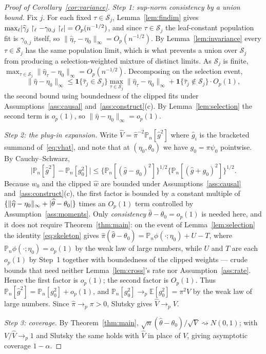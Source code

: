 \documentclass[11pt]{article}
\theoremstyle{plain}
\theoremstyle{definition}
\theoremstyle{remark}
\newcommand{\E}{\mathbb{E}}
\newcommand{\Pn}{\mathbb{P}_n}
\newcommand{\cS}{\mathcal{S}}
\newcommand{\wz}{w_0}
\newcommand{\what}{\widehat{w}}
\newcommand{\that}{\widehat{\tau}}
\newcommand{\thetahat}{\widehat{\theta}}
\newcommand{\pihat}{\widehat{\pi}}
\newcommand{\Vhat}{\widehat{V}}
\newcommand{\Linf}[1]{\lVert #1 \rVert_{\infty}}
\DeclarePairedDelimiter{\abs}{\lvert}{\rvert}
\begin{document}
\begin{proof}[Proof of Corollary~\ref{cor:variance}]
\emph{Step 1: sup-norm consistency by a union bound.} Fix $j$. For each fixed
$\tau\in\cS_j$, Lemma~\ref{lem:findim} gives
$\max_\ell\abs{\widehat\gamma_j\restriction_\ell-\gamma_{0,j}\restriction_\ell}
=O_p(n^{-1/2})$, and since $\tau\in\cS_j$ the leaf-constant population fit is
$\gamma_{0,j}$ itself, so $\Linf{\widehat\eta_\tau-\eta_0}=O_p(n^{-1/2})$. By
Lemma~\ref{lem:invariance} every $\tau\in\cS_j$ has the same population limit,
which is what prevents a union over $\cS_j$ from producing a selection-weighted
mixture of distinct limits. As $\cS_j$ is finite,
$\max_{\tau\in\cS_j}\Linf{\widehat\eta_\tau-\eta_0}=O_p(n^{-1/2})$. Decomposing
on the selection event,
\[
  \Linf{\widehat\eta-\eta_0}
  \le\mathbf1\{\that_j\in\cS_j\}\max_{\tau\in\cS_j}\Linf{\widehat\eta_\tau-\eta_0}
   +\mathbf1\{\that_j\notin\cS_j\}\cdot O_p(1),
\]
the second bound using boundedness of the clipped fits under
Assumptions~\ref{ass:causal} and~\ref{ass:construct}(c). By
Lemma~\ref{lem:selection} the second term is $o_p(1)$, so
$\Linf{\widehat\eta-\eta_0}=o_p(1)$.

\emph{Step 2: the plug-in expansion.} Write $\Vhat=\pihat^{-2}\Pn[\widehat g^2]$
where $\widehat g_i$ is the bracketed summand of~\eqref{eq:vhat}, and note that at
$(\eta_0,\theta_0)$ we have $g_0=\pi\psi_0$ pointwise. By Cauchy--Schwarz,
\[
  \bigl\lvert\Pn[\widehat g^2]-\Pn[g_0^2]\bigr\rvert
  \le\bigl\{\Pn[(\widehat g-g_0)^2]\bigr\}^{1/2}
   \bigl\{\Pn[(\widehat g+g_0)^2]\bigr\}^{1/2} .
\]
Because $\wz$ and the clipped $\what$ are bounded under
Assumptions~\ref{ass:causal} and~\ref{ass:construct}(c), the first factor is
bounded by a constant multiple of
$\{\Linf{\widehat\eta-\eta_0}+\abs{\thetahat-\theta_0}\}$ times an $O_p(1)$ term
controlled by Assumption~\ref{ass:moments}. Only \emph{consistency}
$\thetahat-\theta_0=o_p(1)$ is needed here, and it does not require
Theorem~\ref{thm:main}: on the event of Lemma~\ref{lem:selection} the identity
\eqref{eq:skeleton} gives
$\pihat(\thetahat-\theta_0)=\Pn\phi(\cdot;\eta_0)+U-T$, where
$\Pn\phi(\cdot;\eta_0)=o_p(1)$ by the weak law of large numbers, while $U$ and $T$
are each $o_p(1)$ by Step~1 together with boundedness of the clipped weights ---
crude bounds that need neither Lemma~\ref{lem:cross}'s rate nor
Assumption~\ref{ass:rate}. Hence the first factor is $o_p(1)$; the second factor
is $O_p(1)$. Thus $\Pn[\widehat g^2]=\Pn[g_0^2]+o_p(1)$, and
$\Pn[g_0^2]\to_p\E[g_0^2]=\pi^2V$ by the weak law of large numbers. Since
$\pihat\to_p\pi>0$, Slutsky gives $\Vhat\to_pV$.

\emph{Step 3: coverage.} By Theorem~\ref{thm:main},
$\sqrt n(\thetahat-\theta_0)/\sqrt V\rightsquigarrow N(0,1)$; with
$V/\Vhat\to_p1$ and Slutsky the same holds with $\Vhat$ in place of $V$, giving
asymptotic coverage $1-\alpha$.
\end{proof}
\end{document}
